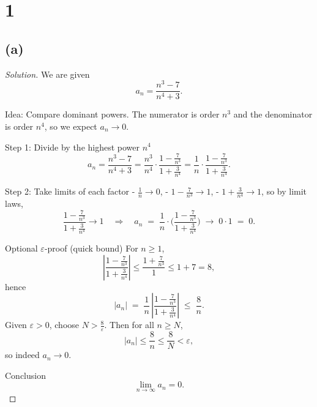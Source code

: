 \documentclass[12pt,a4paper]{article}
\theoremstyle{definition}
\theoremstyle{remark}
\newenvironment{solution}{\begin{proof}[Solution]}{\end{proof}}
\begin{document}
\section*{1}
\subsection*{(a)}

\begin{solution}
We are given
\[
a_n=\frac{n^3-7}{n^4+3}.
\]

Idea: Compare dominant powers. The numerator is order $n^3$ and the denominator is order $n^4$, so we expect $a_n \to 0$.

Step 1: Divide by the highest power $n^4$
\[
a_n
= \frac{n^3-7}{n^4+3}
= \frac{n^3}{n^4}\cdot \frac{1-\frac{7}{n^3}}{1+\frac{3}{n^4}}
= \frac{1}{n}\cdot \frac{1-\frac{7}{n^3}}{1+\frac{3}{n^4}}.
\]

Step 2: Take limits of each factor
- $\frac{1}{n}\to 0$,
- $1-\frac{7}{n^3}\to 1$,
- $1+\frac{3}{n^4}\to 1$,
so by limit laws,
\[
\frac{1-\frac{7}{n^3}}{1+\frac{3}{n^4}} \longrightarrow 1
\quad\Longrightarrow\quad
a_n \;=\; \frac{1}{n}\cdot \Biggl(\frac{1-\frac{7}{n^3}}{1+\frac{3}{n^4}}\Biggr)\;\longrightarrow\; 0\cdot 1 \;=\; 0.
\]

Optional $\varepsilon$-proof (quick bound)  
For $n\ge 1$,
\[
\left|\frac{1-\frac{7}{n^3}}{1+\frac{3}{n^4}}\right|
\le \frac{1+\frac{7}{n^3}}{1} \le 1+7 = 8,
\]
hence
\[
|a_n| \;=\; \frac{1}{n}\,\left|\frac{1-\frac{7}{n^3}}{1+\frac{3}{n^4}}\right|
\;\le\; \frac{8}{n}.
\]
Given $\varepsilon>0$, choose $N>\frac{8}{\varepsilon}$. Then for all $n\ge N$,
\[
|a_n|\le \frac{8}{n}\le \frac{8}{N}<\varepsilon,
\]
so indeed $a_n\to 0$.

Conclusion
\[
\boxed{\lim_{n\to\infty} a_n = 0.}
\]
\end{solution}


\end{document}
